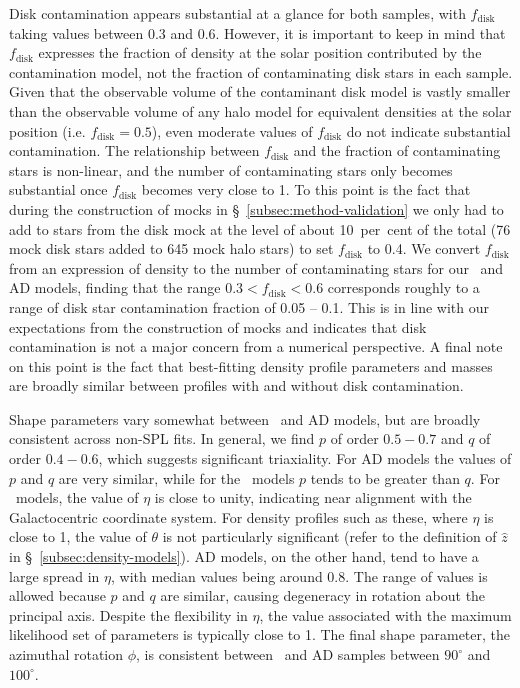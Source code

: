 Disk contamination appears substantial at a glance for both samples, with $f_\mathrm{disk}$ taking values between 0.3 and 0.6. However, it is important to keep in mind that $f_\mathrm{disk}$ expresses the fraction of density at the solar position contributed by the contamination model, not the fraction of contaminating disk stars in each sample. Given that the observable volume of the contaminant disk model is vastly smaller than the observable volume of any halo model for equivalent densities at the solar position (i.e. $f_\mathrm{disk}=0.5$), even moderate values of $f_\mathrm{disk}$ do not indicate substantial contamination. The relationship between $f_\mathrm{disk}$ and the fraction of contaminating stars is non-linear, and the number of contaminating stars only becomes substantial once $f_\mathrm{disk}$ becomes very close to 1. To this point is the fact that during the construction of mocks in \S~\ref{subsec:method-validation} we only had to add to stars from the disk mock at the level of about 10~per~cent of the total (76 mock disk stars added to 645 mock halo stars) to set $f_\mathrm{disk}$ to 0.4. We convert $f_\mathrm{disk}$ from an expression of density to the number of contaminating stars for our \eLz\ and AD models, finding that the range $0.3 < f_\mathrm{disk} < 0.6$ corresponds roughly to a range of disk star contamination fraction of 0.05 -- 0.1. This is in line with our expectations from the construction of mocks and indicates that disk contamination is not a major concern from a numerical perspective. A final note on this point is the fact that best-fitting density profile parameters and masses are broadly similar between profiles with and without disk contamination.

Shape parameters vary somewhat between \eLz\ and AD models, but are broadly consistent across non-SPL fits. In general, we find $p$ of order $0.5-0.7$ and $q$ of order $0.4-0.6$, which suggests significant triaxiality. For AD models the values of $p$ and $q$ are very similar, while for the \eLz\ models $p$ tends to be greater than $q$. For \eLz\ models, the value of $\eta$ is close to unity, indicating near alignment with the Galactocentric coordinate system. For density profiles such as these, where $\eta$ is close to 1, the value of $\theta$ is not particularly significant (refer to the definition of $\hat{z}$ in \S~\ref{subsec:density-models}). AD models, on the other hand, tend to have a large spread in $\eta$, with median values being around 0.8. The range of values is allowed because $p$ and $q$ are similar, causing degeneracy in rotation about the principal axis. Despite the flexibility in $\eta$, the value associated with the maximum likelihood set of parameters is typically close to 1. The final shape parameter, the azimuthal rotation $\phi$, is consistent between \eLz\ and AD samples between $90^{\circ}$ and $100^{\circ}$. 

